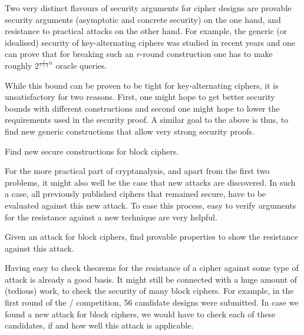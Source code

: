 Two very distinct flavours of security arguments for cipher designs are provable security arguments (asymptotic and concrete security) on the one hand, and resistance to practical attacks on the other hand.
For example, the generic (or idealised) security of key-alternating ciphers was studied in recent years and one can prove that for breaking such an $r$-round construction one has to make roughly $2^{\frac{r}{r+1}n}$ oracle queries.

While this bound can be proven to be tight for key-alternating ciphers, it is unsatisfactory for two reasons.
First, one might hope to get better security bounds with different constructions and second one might hope to lower the requirements used in the security proof.
A similar goal to the above is thus, to find new generic constructions that allow very strong security proofs.

\begin{problem}\label{prob:cipher_constructions}
    Find new secure constructions for block ciphers.
\end{problem}

For the more practical part of cryptanalysis, and apart from the first two problems, it might also well be the case that new attacks are discovered.
In such a case, all previously published ciphers that remained secure, have to be evaluated against this new attack.
To ease this process, easy to verify arguments for the resistance against a new technique are very helpful.

\begin{problem}\label{prob:prove_res_attack}
    Given an attack for block ciphers, find provable properties to show the resistance against this attack.
\end{problem}

Having easy to check theorems for the resistance of a cipher against some type of attack is already a good basis.
It might still be connected with a huge amount of (tedious) work, to check the security of many block ciphers.
For example, in the first round of the \LWC/ competition, 56 candidate designs were submitted.
In case we found a new attack for block ciphers, we would have to check each of these candidates, if and how well this attack is applicable.

